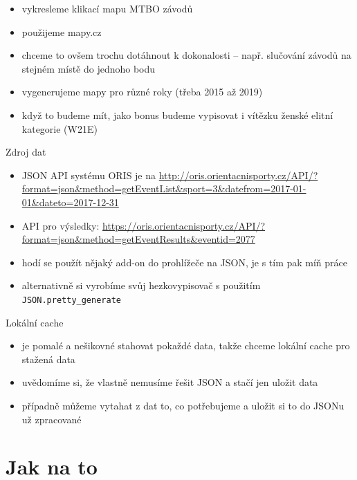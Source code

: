 \documentclass{beamer}
\begin{document}
\begin{frame}{}
  \begin{itemize}
    \item vykresleme klikací mapu MTBO závodů
    \item použijeme mapy.cz
    \item chceme to ovšem trochu dotáhnout k dokonalosti – např. slučování závodů na stejném místě do jednoho bodu
    \item vygenerujeme mapy pro různé roky (třeba 2015 až 2019)
    \item když to budeme mít, jako bonus budeme vypisovat i vítězku ženské elitní kategorie (W21E)
  \end{itemize}
\end{frame}

\begin{frame}{Zdroj dat}
  \begin{itemize}
    \item JSON API systému ORIS je na \url{http://oris.orientacnisporty.cz/API/?format=json\&method=getEventList\&sport=3\&datefrom=2017-01-01\&dateto=2017-12-31}
    \item API pro výsledky: \url{https://oris.orientacnisporty.cz/API/?format=json&method=getEventResults&eventid=2077}
    \item hodí se použít nějaký add-on do prohlížeče na JSON, je s tím pak míň práce
    \item alternativně si vyrobíme svůj hezkovypisovač s použitím \texttt{JSON.pretty\_generate}
  \end{itemize}
\end{frame}

\begin{frame}{Lokální cache}
  \begin{itemize}
    \item je pomalé a nešikovné stahovat pokaždé data, takže chceme lokální cache pro stažená data
    \item uvědomíme si, že vlastně nemusíme řešit JSON a stačí jen uložit data
    \item případně můžeme vytahat z dat to, co potřebujeme a uložit si to do JSONu už zpracované
  \end{itemize}
\end{frame}

\section{Jak na to}
\end{document}
